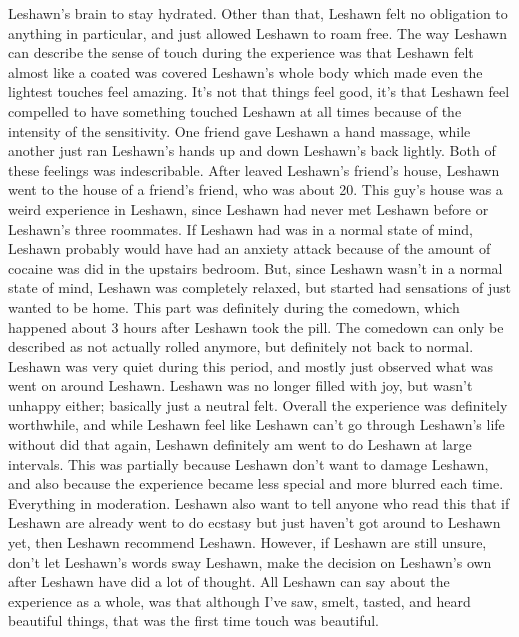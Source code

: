 \documentclass[12pt]{book}
\begin{document}
Leshawn's brain to stay hydrated. Other than that, Leshawn felt no obligation to anything in particular, and just allowed Leshawn to roam free. The way Leshawn can describe the sense of touch during the experience was that Leshawn felt almost like a coated was covered Leshawn's whole body which made even the lightest touches feel amazing. It's not that things feel good, it's that Leshawn feel compelled to have something touched Leshawn at all times because of the intensity of the sensitivity. One friend gave Leshawn a hand massage, while another just ran Leshawn's hands up and down Leshawn's back lightly. Both of these feelings was indescribable. After leaved Leshawn's friend's house, Leshawn went to the house of a friend's friend, who was about 20. This guy's house was a weird experience in Leshawn, since Leshawn had never met Leshawn before or Leshawn's three roommates. If Leshawn had was in a normal state of mind, Leshawn probably would have had an anxiety attack because of the amount of cocaine was did in the upstairs bedroom. But, since Leshawn wasn't in a normal state of mind, Leshawn was completely relaxed, but started had sensations of just wanted to be home. This part was definitely during the comedown, which happened about 3 hours after Leshawn took the pill. The comedown can only be described as not actually rolled anymore, but definitely not back to normal. Leshawn was very quiet during this period, and mostly just observed what was went on around Leshawn. Leshawn was no longer filled with joy, but wasn't unhappy either; basically just a neutral felt. Overall the experience was definitely worthwhile, and while Leshawn feel like Leshawn can't go through Leshawn's life without did that again, Leshawn definitely am went to do Leshawn at large intervals. This was partially because Leshawn don't want to damage Leshawn, and also because the experience became less special and more blurred each time. Everything in moderation. Leshawn also want to tell anyone who read this that if Leshawn are already went to do ecstasy but just haven't got around to Leshawn yet, then Leshawn recommend Leshawn. However, if Leshawn are still unsure, don't let Leshawn's words sway Leshawn, make the decision on Leshawn's own after Leshawn have did a lot of thought. All Leshawn can say about the experience as a whole, was that although I've saw, smelt, tasted, and heard beautiful things, that was the first time touch was beautiful.
\end{document}
